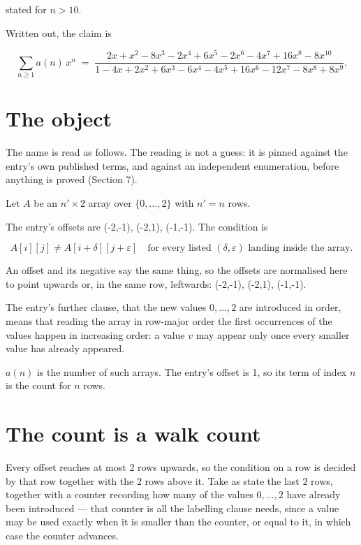 \documentclass[11pt]{article}
\theoremstyle{definition}
\begin{document}
stated for $n > 10$.

Written out, the claim is

\[\sum_{n \ge 1} a(n)\,x^n \;=\; \frac{2x + x^{2} - 8x^{3} - 2x^{4} + 6x^{5} - 2x^{6} - 4x^{7} + 16x^{8} - 8x^{10}}{1 - 4x + 2x^{2} + 6x^{3} - 6x^{4} - 4x^{5} + 16x^{6} - 12x^{7} - 8x^{8} + 8x^{9}}.\]

\section{The object}

The name is read as follows. The reading is not a guess: it is pinned against the entry's own published terms, and against an independent enumeration, before anything is proved (Section 7).

Let $A$ be an $n' \times 2$ array over $\{0,\dots,2\}$ with $n' = n$ rows.

The entry's offsets are (-2,-1), (-2,1), (-1,-1). The condition is

\[A[i][j] \ne A[i{+}\delta][j{+}\varepsilon]\quad\text{for every listed }(\delta,\varepsilon)\text{ landing inside the array.}\]

An offset and its negative say the same thing, so the offsets are normalised here to point upwards or, in the same row, leftwards: (-2,-1), (-2,1), (-1,-1).

The entry's further clause, that the new values $0,\dots,2$ are introduced in order, means that reading the array in row-major order the first occurrences of the values happen in increasing order: a value $v$ may appear only once every smaller value has already appeared.

$a(n)$ is the number of such arrays. The entry's offset is 1, so its term of index $n$ is the count for $n$ rows.

\section{The count is a walk count}

Every offset reaches at most $2$ rows upwards, so the condition on a row is decided by that row together with the $2$ rows above it. Take as state the last $2$ rows, together with a counter recording how many of the values $0,\dots,2$ have already been introduced --- that counter is all the labelling clause needs, since a value may be used exactly when it is smaller than the counter, or equal to it, in which case the counter advances.
\end{document}
